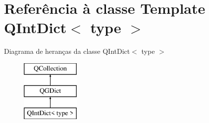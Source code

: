 \hypertarget{class_q_int_dict}{\section{Referência à classe Template Q\-Int\-Dict$<$ type $>$}
\label{class_q_int_dict}
}
Diagrama de heranças da classe Q\-Int\-Dict$<$ type $>$\begin{figure}[H]
\begin{center}
\leavevmode
\includegraphics[height=3.000000cm]{class_q_int_dict}
\end{center}
\end{figure}

